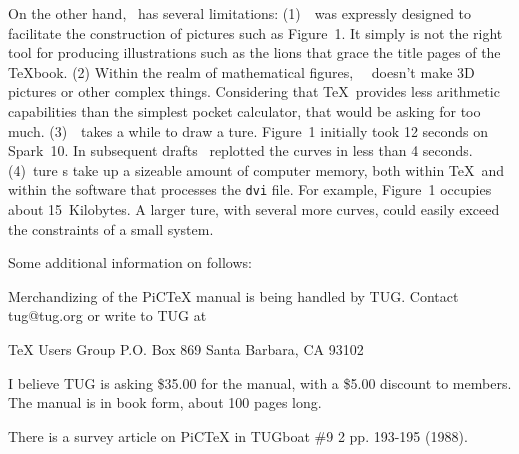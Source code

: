 On the other hand, \PiCTeX\ has several limitations: (1)~\PiCTeX\ was
expressly designed to facilitate the construction of pictures such as
Figure~1.  It simply is not the right tool for producing illustrations 
such as the lions that grace the title pages of the \TeX book.
(2) Within the realm of mathematical figures, ~\PiCTeX\ doesn't 
make 3D pictures or other complex things. Considering that \TeX\ provides
less arithmetic capabilities than the simplest pocket calculator, that
would be asking for too much.
(3)~\PiCTeX\ takes a while to draw a \PiC ture.  
Figure~1 initially took %
12 seconds on Spark~10. In subsequent drafts
\PiCTeX\ replotted the curves in less than 4 seconds.
(4)~\PiC ture s take up a sizeable amount of computer memory,
both within \TeX\ and within the software that processes the {\tt dvi} file.
For example, Figure~1 occupies about 15~Kilobytes. A larger \PiC ture, with
several more curves, could easily exceed the constraints of a small system.
\par
\egroup

\bigskip
Some additional information on \PiCTeX follows:
\medskip
\bgroup 
\def\par{\leavevmode\endgraf}
\obeylines \obeyspaces \tt %

Merchandizing of the PiCTeX manual is being handled by
TUG. Contact tug@tug.org or write to TUG at 

\quad  TeX Users Group
\quad  P.O. Box 869
\quad  Santa Barbara, CA 93102

I believe TUG is asking \$35.00 for the manual, with a \$5.00 
discount to members. The manual is in book form, about 100 
pages long.

There is a survey article on PiCTeX in TUGboat \#9 2 pp. 193-195 
(1988).
\par
\egroup
\bye

